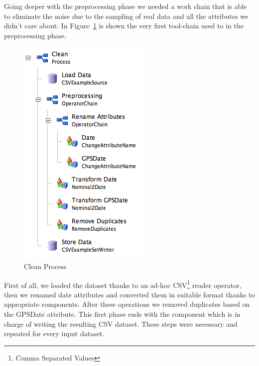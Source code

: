 Going deeper with the preprocessing phase we needed a work chain that is able to eliminate the noise due to the sampling of real data and all the attributes we didn't care about.
In Figure~\ref{figure:clean} is shown the very first tool-chain used to in the preprocessing phase.\newline


\begin{figure}
  \begin{center}
    \includegraphics[scale=0.55]{images/clean.png}
  \end{center}
  \caption{Clean Process}
  \label{figure:clean}
\end{figure}





First of all, we loaded the dataset thanks to an ad-hoc CSV\footnote{Comma Separated Values} reader operator, then we renamed date attributes and converted them in suitable format thanks to appropriate components. After these operations we removed duplicates based on the GPSDate attribute. This first phase ends with the component which is in charge of writing the resulting CSV dataset. These steps were necessary and repeated for every input dataset.\newline

